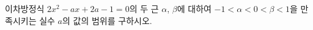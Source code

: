 이차방정식 $2x^2-ax+2a-1=0$의 두 근 $\alpha$, $\beta$에 대하여 $-1<\alpha<0<\beta<1$을 만족시키는 실수 $a$의 값의 범위를 구하시오.
